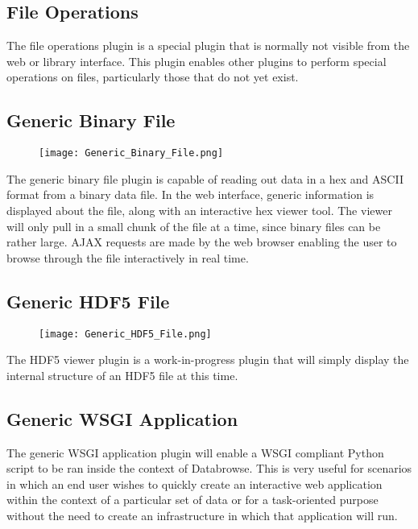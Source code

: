 \documentclass[10pt]{article}
\begin{document}
\endgroup



\begin{changemargin}{0in}{220.6pt}
\subsection{File Operations}
The file operations plugin is a special plugin that is normally not visible from the web or library interface.  This plugin enables other plugins to perform special operations on files, particularly those that do not yet exist.
\end{changemargin}



\begingroup
\setlength\intextsep{0pt}
\subsection{Generic Binary File}
\begin{wrapfigure}[20]{R}{0.45\textwidth}
		\texttt{[image: Generic\_Binary\_File.png]}
\end{wrapfigure}
The generic binary file plugin is capable of reading out data in a hex and ASCII format from a binary data file.  In the web interface, generic information is displayed about the file, along with an interactive hex viewer tool.  The viewer will only pull in a small chunk of the file at a time, since binary files can be rather large.  AJAX requests are made by the web browser enabling the user to browse through the file interactively in real time.

\endgroup

\clearpage
\begingroup
\setlength\intextsep{0pt}
\subsection{Generic HDF5 File}
\begin{wrapfigure}[20]{R}{0.45\textwidth}
		\texttt{[image: Generic\_HDF5\_File.png]}
\end{wrapfigure}
The HDF5 viewer plugin is a work-in-progress plugin that will simply display the internal structure of an HDF5 file at this time.

\endgroup

\hfill \break
\hfill \break
\hfill \break
\hfill \break
\hfill \break
\hfill \break
\hfill \break
\hfill \break
\hfill \break
\hfill \break
\hfill \break
\hfill \break
\hfill \break


\begin{changemargin}{0in}{220.6pt}
\subsection{Generic WSGI Application}
The generic WSGI application plugin will enable a WSGI compliant Python script to be ran inside the context of Databrowse.  This is very useful for scenarios in which an end user wishes to quickly create an interactive web application within the context of a particular set of data or for a task-oriented purpose without the need to create an infrastructure in which that application will run.
\end{changemargin}
\end{document}
